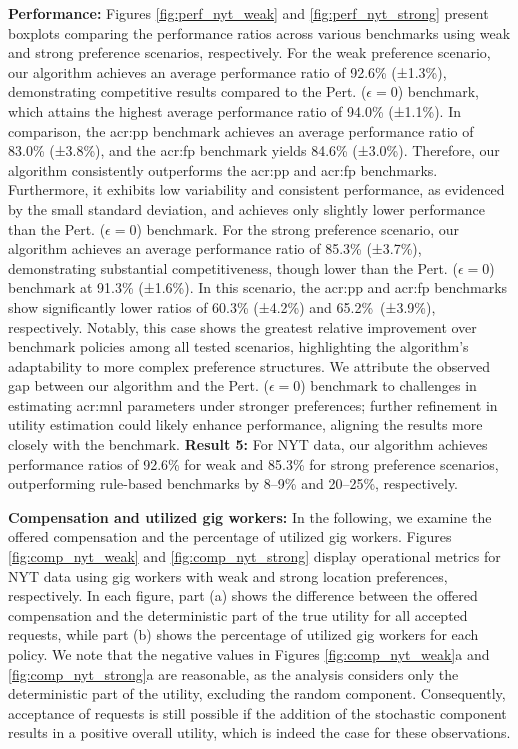 \noindent \textbf{Performance:} Figures \ref{fig:perf_nyt_weak} and \ref{fig:perf_nyt_strong} present boxplots comparing the performance ratios across various benchmarks using weak and strong preference scenarios, respectively. For the weak preference scenario, our algorithm achieves an average performance ratio of 92.6\% (±1.3\%), demonstrating competitive results compared to the Pert. ($\epsilon=0$) benchmark, which attains the highest average performance ratio of 94.0\% (±1.1\%). In comparison, the \gls{acr:pp} benchmark achieves an average performance ratio of 83.0\% (±3.8\%), and the \gls{acr:fp} benchmark yields 84.6\% (±3.0\%). Therefore, our algorithm consistently outperforms the \gls{acr:pp} and \gls{acr:fp} benchmarks. Furthermore, it exhibits low variability and consistent performance, as evidenced by the small standard deviation, and achieves only slightly lower performance than the Pert. ($\epsilon=0$) benchmark. For the strong preference scenario, our algorithm achieves an average performance ratio of 85.3\% (±3.7\%), demonstrating substantial competitiveness, though lower than the Pert. ($\epsilon=0$) benchmark at 91.3\% (±1.6\%). In this scenario, the \gls{acr:pp} and \gls{acr:fp} benchmarks show significantly lower ratios of 60.3\% (±4.2\%) and 65.2\%~(±3.9\%), respectively. Notably, this case shows the greatest relative improvement over benchmark policies among all tested scenarios, highlighting the algorithm's adaptability to more complex preference structures. We attribute the observed gap between our algorithm and the Pert. ($\epsilon=0$) benchmark to challenges in estimating \gls{acr:mnl} parameters under stronger preferences; further refinement in utility estimation could likely enhance performance, aligning the results more closely with the benchmark.
\noindent \textbf{Result 5:} For NYT data, our algorithm achieves performance ratios of 92.6\% for weak and 85.3\% for strong preference scenarios, outperforming rule-based benchmarks by 8–9\% and 20–25\%, respectively.

\noindent \textbf{Compensation and utilized gig workers:} In the following, we examine the offered compensation and the percentage of utilized gig workers. Figures \ref{fig:comp_nyt_weak} and \ref{fig:comp_nyt_strong} display operational metrics for NYT data using gig workers with weak and strong location preferences, respectively. In each figure, part (a) shows the difference between the offered compensation and the deterministic part of the true utility for all accepted requests, while part (b) shows the percentage of utilized gig workers for each policy. We note that the negative values in Figures \ref{fig:comp_nyt_weak}a and \ref{fig:comp_nyt_strong}a are reasonable, as the analysis considers only the deterministic part of the utility, excluding the random component. Consequently, acceptance of requests is still possible if the addition of the stochastic component results in a positive overall utility, which is indeed the case for these observations.  

